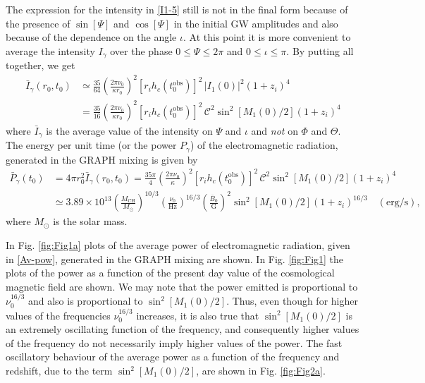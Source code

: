 \documentclass[a4paper,11pt]{article}
\begin{document}
The expression for the intensity in \eqref{I1-5} still is not in the final form because of the presence of $\sin[\Psi]$ and $\cos[\Psi]$ in the initial GW amplitudes and also because of the dependence on the angle $\iota$. At this point it is more convenient to average the intensity $I_\gamma$ over the phase $0\leq \Psi\leq 2\pi$ and $0\leq \iota\leq \pi$.  By putting all together, we get
\begin{align}\label{Av-int}
\bar I_\gamma(r_0, t_0) & \simeq \frac{35}{64}\left(\frac{2\pi\nu_0}{\kappa r_0}\right)^2 [r_i h_c(t_0^\text{obs})]^2\, |I_1(0)|^2 (1+z_i)^4\nonumber\\
& = \frac{35}{16}\left(\frac{2\pi\nu_0}{\kappa r_0}\right)^2 [r_i h_c(t_0^\text{obs})]^2\,  \mathcal C^2 \sin^2[M_1(0)/2](1+z_i)^4
\end{align}
where $\bar I_\gamma$ is the average value of the intensity on $\Psi$ and $\iota$ and \emph{not} on $\Phi$ and $\Theta$. The energy per unit time (or the power $P_\gamma$) of the electromagnetic radiation, generated in the GRAPH mixing is given by
\begin{align}\label{Av-pow}
\bar P_\gamma(t_0) & =4\pi r_0^2 \bar I_\gamma(r_0, t_0)=\frac{35\pi}{4}\left(\frac{2\pi\nu_0}{\kappa }\right)^2 [r_i h_c(t_0^\text{obs})]^2\,  \mathcal C^2 \sin^2[M_1(0)/2](1+z_i)^4\nonumber\\
& \simeq 3.89\times 10^{13} \left(\frac{M_\text{CH}}{M_\odot}\right)^{10/3}\left(\frac{\nu_0}{\text{Hz}}\right)^{16/3}\left(\frac{\bar B_0}{\text{G}}\right)^2\sin^2[M_1(0)/2](1+z_i)^{16/3}\quad (\text{erg}/\text{s}),
\end{align}
where $M_\odot$ is the solar mass.

In Fig. \ref{fig:Fig1a} plots of the average power of electromagnetic radiation, given in \eqref{Av-pow},  generated in the GRAPH mixing are shown. In Fig. \ref{fig:Fig1} the plots of the power as a function of the present day value of the cosmological magnetic field are shown. We may note that the power emitted is proportional to $\nu_0^{16/3}$ and also is  proportional to $\sin^2[M_1(0)/2]$. Thus, even though for higher values of the frequencies $\nu_0^{16/3}$ increases, it is also true that $\sin^2[M_1(0)/2]$ is an extremely oscillating function of the frequency, and consequently higher values of the frequency do not necessarily imply higher values of the power. The fast oscillatory behaviour of the average power as a function of the frequency and redshift, due to the term $\sin^2[M_1(0)/2]$, are shown in Fig. \ref{fig:Fig2a}.
\end{document}
